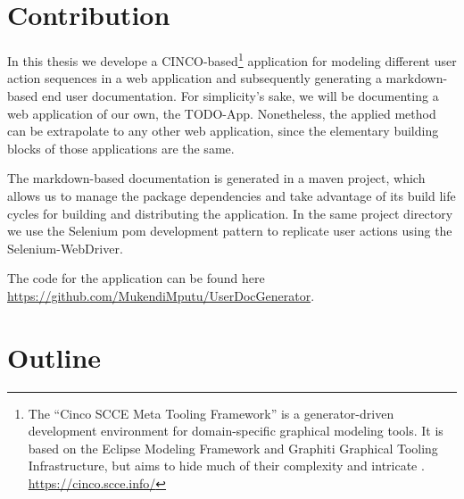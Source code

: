 \section{Contribution}
In this thesis we develope a CINCO-based\footnote{The “Cinco SCCE Meta Tooling Framework” is a generator-driven development environment for domain-specific graphical modeling tools. It is based on the Eclipse Modeling Framework and Graphiti Graphical Tooling Infrastructure, but aims to hide much of their complexity and intricate . \url{https://cinco.scce.info/}} application for modeling different user action sequences in a web application and subsequently generating a markdown-based end user documentation. For simplicity's sake, we will be documenting a web application of our own, the TODO-App. Nonetheless, the applied method can be extrapolate to any other web application, since the elementary building blocks of those applications are the same. 

The markdown-based documentation is generated in a maven project, which allows us to manage the package dependencies and take advantage of its build life cycles for building and distributing the application. In the same project directory we use the \gls{Selenium} \acrfull{pom} development pattern to replicate user actions using the Selenium-WebDriver. 

The code for the application can be found here \url{https://github.com/MukendiMputu/UserDocGenerator}.
\section{Outline}